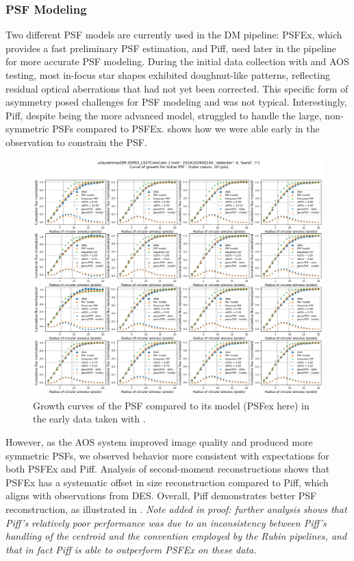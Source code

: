 \subsubsection{PSF Modeling}

Two different PSF models are currently used in the DM pipeline: PSFEx, which provides a fast preliminary PSF estimation, and Piff, used later in the pipeline for more accurate PSF modeling. During the initial data collection with \ComCam and AOS testing, most in-focus star shapes exhibited doughnut-like patterns, reflecting residual optical aberrations that had not yet been corrected. This specific form of asymmetry posed challenges for PSF modeling and was not typical. Interestingly, Piff, despite being the more advanced model, struggled to handle the large, non-symmetric PSFs compared to PSFEx.  shows how we were able early in the observation to constrain the PSF.


\begin{figure}
        \centering
        \includegraphics[scale=0.2]{figures/curveOfGrowth_pfsex_u_laurenma_DM-30993_LSSTComCam_2024102900140_4}
        \caption{\small Growth curves of the PSF compared to its model (PSFex here)  in the early data taken with \ComCam. }
        \label{fig:growth_plot}
\end{figure}



However, as the AOS system improved image quality and produced more symmetric PSFs, we observed behavior more consistent with expectations for both PSFEx and Piff. 
Analysis of second-moment reconstructions shows that PSFEx has a systematic offset in size reconstruction
compared to Piff, which aligns with observations from DES. Overall, Piff demonstrates better PSF
reconstruction, as illustrated in . \textit{Note added in proof: further analysis shows
  that Piff's relatively poor performance was due to an inconsistency between Piff's handling of the centroid
  and the convention employed by the Rubin pipelines, and that in fact Piff is able to outperform PSFEx
  on these data.}

